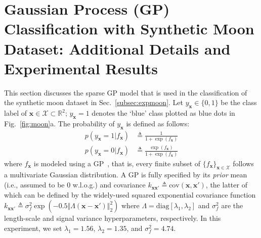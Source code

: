 \documentclass{article}
\theoremstyle{definition}
\newcommand{\mbf}[1]{\mathbf{#1}}
\newcommand{\mcl}[1]{\mathcal{#1}}
\newcommand{\mbb}[1]{\mathbb{#1}}
\begin{document}
\section{Gaussian Process (GP) Classification with Synthetic Moon Dataset: Additional Details and Experimental Results}
\label{app:moon}
%
This section discusses the sparse GP model that is used in the classification of the synthetic moon dataset in Sec.~\ref{subsec:expmoon}.
Let $y_{\mbf{x}} \in \{0,1\}$ be the class label of $\mbf{x} \in \mcl{X} \subset \mbb{R}^2$; $y_\mbf{x} = 1$ denotes the `blue' class plotted as blue dots in Fig.~\ref{fig:moon}a. The probability of $y_{\mbf{x}}$ is defined as follows:
%
\begin{equation}
\begin{aligned}
p(y_{\mbf{x}} = 1|f_{\mbf{x}}) & \triangleq \frac{1}{1 + \exp(f_{\mbf{x}})}\\
p(y_{\mbf{x}} = 0|f_{\mbf{x}}) & \triangleq  \frac{\exp(f_{\mbf{x}})}{1 + \exp(f_{\mbf{x}})}
\end{aligned}
\label{eq:moonll}
\end{equation}
%
where $f_{\mbf{x}}$ is modeled using a GP~\cite{rasmussen06}, that is, every finite subset of $\{f_{\mbf{x}}\}_{\mbf{x} \in \mcl{X}}$ follows a multivariate Gaussian distribution. A GP is fully specified by its \emph{prior} mean (i.e., assumed to be $0$ w.l.o.g.) and covariance $k_{\mbf{x}\mbf{x}'} \triangleq \text{cov}(\mbf{x}, \mbf{x}')$, the latter of which can be defined by the widely-used squared exponential covariance function $k_{\mbf{x}\mbf{x}'} \triangleq \sigma_f^2 \exp(-0.5 \Vert \Lambda(\mbf{x} - \mbf{x}')\Vert_2^2)$ where $\Lambda = \text{diag}[\lambda_1, \lambda_2]$ and $\sigma_f^2$ are the length-scale and signal variance hyperparameters, respectively. In this experiment, we set $\lambda_1 = 1.56$, $\lambda_2 = 1.35$, and $\sigma_f^2 = 4.74$.
\end{document}
